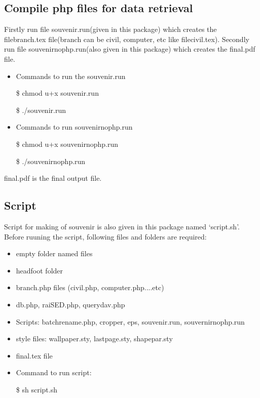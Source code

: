\documentclass{article}
\begin{document}
\subsection*{Compile php files for data retrieval}
Firstly run file souvenir.run(given in this package) which creates the filebranch.tex file(branch can be civil, computer, etc like {filecivil.tex}). Secondly run file souvenirnophp.run(also given in this package) which creates the final.pdf file.
\begin{itemize}
\item Commands to run the souvenir.run 

\$ chmod u+x souvenir.run

\$ ./souvenir.run

\item Commands to run souvenirnophp.run

\$ chmod u+x souvenirnophp.run

\$ ./souvenirnophp.run
\end{itemize}
final.pdf is the final output file.

\subsection*{Script}
Script for making of souvenir is also given in this package named `script.sh'. Before ruuning the script, following files and folders are required:
\begin{itemize}
\item empty folder named files
\item headfoot folder
\item branch.php files (civil.php, computer.php....etc)
\item db.php, raiSED.php, querydav.php
\item Scripts: batchrename.php, cropper, eps, souvenir.run, souvernirnophp.run
\item style files: wallpaper.sty, lastpage.sty, shapepar.sty
\item final.tex file
\end{itemize}
\begin{itemize}
\item Command to run script:

\$ sh script.sh
\end{itemize}
\end{document}
